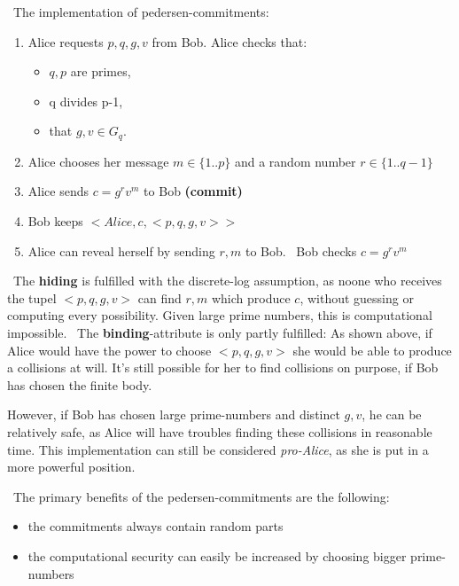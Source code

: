 ~\newline The implementation of pedersen-commitments: 
	\begin{enumerate}
		\item Alice requests $p,q,g,v$ from Bob. \newline Alice checks that:
		\begin{itemize}
			\item $q,p$ are primes, 
			\item q divides p-1, 
			\item that $g,v \in G_q$. 
		\end{itemize}
		\item Alice chooses her message $m \in \{1..p\}$ and a random number $r \in \{1..q-1\}$
		\item Alice sends $c = g^rv^m$ to Bob \textbf{(commit)}
		\item Bob keeps $<Alice,c,<p,q,g,v>>$
		\item Alice can reveal herself by sending $r,m$ to Bob. ~\newline Bob checks $c = g^rv^m$
	\end{enumerate}

~\newline The \textbf{hiding} is fulfilled with the discrete-log assumption, as noone who receives the tupel $<p,q,g,v>$ can find $r,m$ which produce $c$, without guessing or computing every possibility. Given large prime numbers, this is computational impossible. 
~\newline The \textbf{binding}-attribute is only partly fulfilled: As shown above, if Alice would have the power to choose $<p,q,g,v>$ she would be able to produce a collisions at will. It's still possible for her to find collisions on purpose, if Bob has chosen the finite body. 

However, if Bob has chosen large prime-numbers and distinct $g,v$, he can be relatively safe, as Alice will have troubles finding these collisions in reasonable time. This implementation can still be considered \textit{pro-Alice}, as she is put in a more powerful position.    

~\newline The primary benefits of the pedersen-commitments are the following: 
\begin{itemize}
	\item the commitments always contain random parts
	\item the computational security can easily be increased by choosing bigger prime-numbers
\end{itemize}
